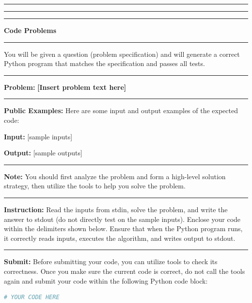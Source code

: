 \begin{tcolorbox}[
colframe=gray!30,
colback=gray!5,
coltitle=black!100,
title=\textit{\textbf{Prompt Template for Code Problems}}
]

\rule{1.0\textwidth}{0.4pt}
\hrule
\vspace{0.3ex}
\hrule

\begin{center}
    \textbf{\large Code Problems}
\end{center}
\vspace{-0.8em}
\rule{1.0\textwidth}{0.4pt}

You will be given a question (problem specification) and will generate a correct Python program that matches the specification and passes all tests.

\rule{1.0\textwidth}{0.4pt}

\textbf{Problem:} \textcolor{violet!90}{\textbf{[Insert problem text here]}}

\rule{1.0\textwidth}{0.4pt}

\textbf{Public Examples:} Here are some input and output examples of the expected code:

\textcolor{green!50!black}{\textbf{Input:}} [sample inputs]

\textcolor{green!50!black}{\textbf{Output:}} [sample outputs]

\rule{1.0\textwidth}{0.4pt}

\textbf{Note:} You should first analyze the problem and form a high-level solution strategy, then utilize the tools to help you solve the problem.

\rule{1.0\textwidth}{0.4pt}

\textbf{Instruction:} Read the inputs from stdin, solve the problem, and write the answer to stdout (do not directly test on the sample inputs). Enclose your code within the delimiters shown below. Ensure that when the Python program runs, it correctly reads inputs, executes the algorithm, and writes output to stdout.

\rule{1.0\textwidth}{0.4pt}

\textbf{Submit:} Before submitting your code, you can utilize tools to check its correctness. Once you make sure the current code is correct, do not call the tools again and submit your code within the following Python code block:

\begin{lstlisting}[language=Python]
# YOUR CODE HERE
\end{lstlisting}

\end{tcolorbox}











